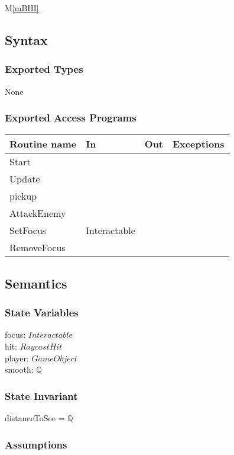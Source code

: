 \documentclass[12pt]{article}
\newcommand{\mref}[1]{M\ref{#1}}
\begin{document}
\mref{mBHI}

\subsection* {Syntax}

\subsubsection* {Exported Types}

None

\subsubsection* {Exported Access Programs}

\begin{tabular}{| l | l | l | l |}
\hline
\textbf{Routine name} & \textbf{In} & \textbf{Out} & \textbf{Exceptions}\\
\hline
Start & ~ & ~  & ~\\
Update & ~ & ~ & ~\\
pickup & ~ & ~ & ~\\
AttackEnemy & ~ & ~ & ~\\
SetFocus & Interactable & ~ & ~\\
RemoveFocus & ~ & ~ & ~\\
\hline
\end{tabular}

\subsection* {Semantics}

\subsubsection* {State Variables}

focus: $Interactable$\\
hit: $RaycastHit$\\
player: $GameObject$\\
smooth: $\mathbb{Q}$

\subsubsection* {State Invariant}

distanceToSee = $\mathbb{Q}$

\subsubsection* {Assumptions}
\end{document}
